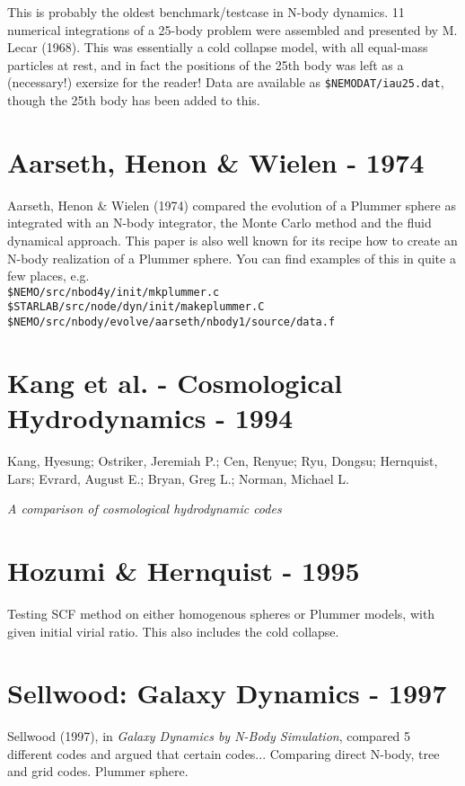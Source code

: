 This is probably the oldest benchmark/testcase in N-body dynamics.
11 numerical integrations of a 25-body problem were assembled and presented
by M. Lecar (1968).
This was essentially a cold collapse model, with all equal-mass 
particles at rest, and
in fact the positions of the 25th body was left as a (necessary!)
exersize for the reader!
Data are available as {\tt \$NEMODAT/iau25.dat}, though the 25th body has
been added to this.

\section{Aarseth, Henon \& Wielen - 1974}

Aarseth, Henon \& Wielen (1974) compared the evolution of a 
Plummer sphere as integrated with an N-body integrator,
the Monte Carlo method and the fluid dynamical approach.
This paper is also well known for its recipe how to create
an N-body realization of a Plummer sphere. You can find examples
of this in quite a few places, e.g.\\
{\tt \$NEMO/src/nbod4y/init/mkplummer.c}\\
{\tt \$STARLAB/src/node/dyn/init/makeplummer.C}\\
{\tt \$NEMO/src/nbody/evolve/aarseth/nbody1/source/data.f}


\section{Kang et al. - Cosmological Hydrodynamics - 1994}


Kang, Hyesung; Ostriker, Jeremiah P.; Cen, Renyue; Ryu, Dongsu;
Hernquist, Lars; Evrard, August E.; Bryan, Greg L.; Norman, Michael L.

{\it A comparison of cosmological hydrodynamic codes}

\section{Hozumi \& Hernquist - 1995}

Testing SCF method on either homogenous spheres or Plummer models, with
given initial virial ratio. This also includes the cold collapse.

\section{Sellwood: Galaxy Dynamics - 1997}

Sellwood (1997), in {\it Galaxy Dynamics by N-Body Simulation},
compared 5 different codes and argued that certain codes...
Comparing direct N-body, tree and grid codes. Plummer
sphere.



